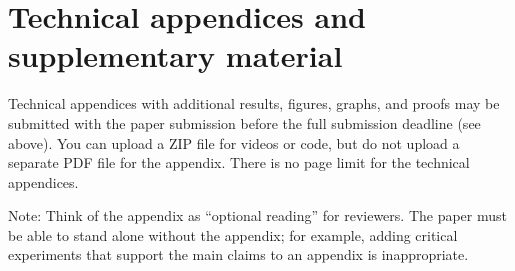 \documentclass{article}
\theoremstyle{plain}
\theoremstyle{definition}
\theoremstyle{remark}
\begin{document}
\section{Technical appendices and supplementary material}
Technical appendices with additional results, figures, graphs, and proofs may be submitted with the paper submission before the full submission deadline (see above). You can upload a ZIP file for videos or code, but do not upload a separate PDF file for the appendix. There is no page limit for the technical appendices. 

Note: Think of the appendix as ``optional reading'' for reviewers. The paper must be able to stand alone without the appendix; for example, adding critical experiments that support the main claims to an appendix is inappropriate. 


\newpage

\end{document}
